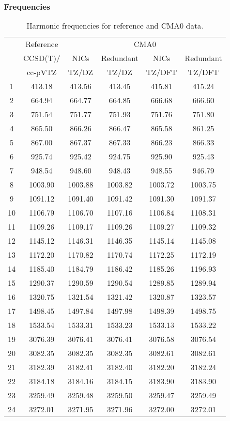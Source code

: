 \documentclass[10pt,oneside]{article}
\begin{document}
\begin{table}[h!]
\subsubsection*{Frequencies}
\centering
\caption{Harmonic frequencies for reference and CMA0 data.}
\begin{tabular}{cccccc}
\toprule
{} & Reference & \multicolumn{4}{c}{CMA0} \\
{} &  CCSD(T)/ &    NICs &  Redundant &    NICs & Redundant \\
{} &   cc-pVTZ &   TZ/DZ &      TZ/DZ &  TZ/DFT &    TZ/DFT \\
\midrule
1  &    413.18 &  413.56 &     413.45 &  415.81 &    415.24 \\
2  &    664.94 &  664.77 &     664.85 &  666.68 &    666.60 \\
3  &    751.54 &  751.77 &     751.93 &  751.76 &    751.80 \\
4  &    865.50 &  866.26 &     866.47 &  865.58 &    861.25 \\
5  &    867.00 &  867.37 &     867.33 &  866.23 &    866.33 \\
6  &    925.74 &  925.42 &     924.75 &  925.90 &    925.43 \\
7  &    948.54 &  948.60 &     948.43 &  948.55 &    946.79 \\
8  &   1003.90 & 1003.88 &    1003.82 & 1003.72 &   1003.75 \\
9  &   1091.12 & 1091.40 &    1091.42 & 1091.30 &   1091.37 \\
10 &   1106.79 & 1106.70 &    1107.16 & 1106.84 &   1108.31 \\
11 &   1109.26 & 1109.17 &    1109.26 & 1109.27 &   1109.32 \\
12 &   1145.12 & 1146.31 &    1146.35 & 1145.14 &   1145.08 \\
13 &   1172.20 & 1170.82 &    1170.74 & 1172.25 &   1172.19 \\
14 &   1185.40 & 1184.79 &    1186.42 & 1185.26 &   1196.93 \\
15 &   1290.37 & 1290.59 &    1290.54 & 1289.85 &   1289.94 \\
16 &   1320.75 & 1321.54 &    1321.42 & 1320.87 &   1323.57 \\
17 &   1498.45 & 1497.84 &    1497.98 & 1498.39 &   1498.75 \\
18 &   1533.54 & 1533.31 &    1533.23 & 1533.13 &   1533.22 \\
19 &   3076.39 & 3076.41 &    3076.41 & 3076.58 &   3076.54 \\
20 &   3082.35 & 3082.35 &    3082.35 & 3082.61 &   3082.61 \\
21 &   3182.39 & 3182.41 &    3182.40 & 3182.20 &   3182.24 \\
22 &   3184.18 & 3184.16 &    3184.15 & 3183.90 &   3183.90 \\
23 &   3259.49 & 3259.48 &    3259.50 & 3259.47 &   3259.49 \\
24 &   3272.01 & 3271.95 &    3271.96 & 3272.00 &   3272.01 \\
\bottomrule
\end{tabular}
\end{table}
\end{document}
